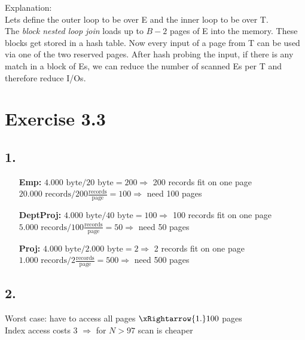 \documentclass[12pt]{article}
\begin{document}
		Explanation:\\
		Lets define the outer loop to be over E and the inner loop to be over T.\\
		The \textit{block nested loop join} loads up to $B-2$ pages of E into the memory. These blocks get stored in a hash table. Now every input of a page from T can be used via one of the two reserved pages. After hash probing the input, if there is any match in a block of Es, we can reduce the number of scanned Es per T and therefore reduce I/Os.
		
	\section*{Exercise 3.3}
	\subsection*{1.}
		\begin{itemize}
			\setlength{\itemindent}{1cm}
			\item[\textbf{Emp:}] $4.000\text{ byte}/20\text{ byte}= 200 \Rightarrow$ 200 records fit on one page\\
						$20.000\text{ records}/200\frac{\text{records}}{\text{page}}= 100 \Rightarrow$ need 100 pages
			\item[\textbf{DeptProj:}] $4.000\text{ byte}/40\text{ byte}= 100 \Rightarrow$ 100 records fit on one page\\
							 $5.000\text{ records}/100\frac{\text{records}}{\text{page}}= 50 \Rightarrow$ need 50 pages
			\item[\textbf{Proj:}] $4.000\text{ byte}/2.000\text{ byte}= 2 \Rightarrow$ 2 records fit on one page\\
						 $1.000\text{ records}/2\frac{\text{records}}{\text{page}}= 500 \Rightarrow$ need 500 pages
		\end{itemize}
	\subsection*{2.}
		Worst case: have to access all pages $\xRightarrow{1.} 100$ pages\\
		Index access costs 3 $\Rightarrow$ for $N > 97$ scan is cheaper
\end{document}
